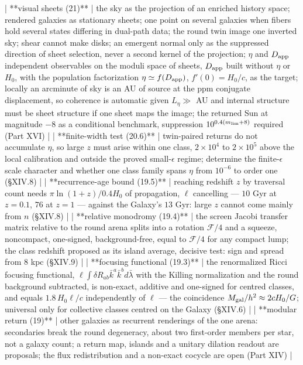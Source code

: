 | **visual sheets (21)** | the sky as the projection of an enriched history space; rendered galaxies as stationary sheets; one point on several galaxies when fibers hold several states differing in dual-path data; the round twin image one inverted sky; shear cannot make disks; an emergent normal only as the suppressed direction of sheet selection, never a second kernel of the projection; $\eta$ and $D_{\rm app}$ independent observables on the moduli space of sheets, $D_{\rm app}$ built without $\eta$ or $H_0$, with the population factorization $\eta\simeq f(D_{\rm app})$, $f'(0) = H_0/c$, as the target; locally an arcminute of sky is an AU of source at the ppm conjugate displacement, so coherence is automatic given $L_\eta\gg$ AU and internal structure must be sheet structure if one sheet maps the image; the returned Sun at magnitude $-8$ as a conditional benchmark, suppression $10^{0.4(m_{\rm lim}+8)}$ required (Part XVI) |
| **finite-width test (20.6)** | twin-paired returns do not accumulate $\eta$, so large $z$ must arise within one class, $2\times10^4$ to $2\times10^5$ above the local calibration and outside the proved small-$\epsilon$ regime; determine the finite-$\epsilon$ scale character and whether one class family spans $\eta$ from $10^{-6}$ to order one (§XIV.8) |
| **recurrence-age bound (19.5)** | reaching redshift $z$ by traversal count needs $\pi\ln(1+z)/0.4H_0$ of propagation, $\ell$ cancelling — $10$ Gyr at $z = 0.1$, $76$ at $z = 1$ — against the Galaxy's $13$ Gyr: large $z$ cannot come mainly from $n$ (§XIV.8) |
| **relative monodromy (19.4)** | the screen Jacobi transfer matrix relative to the round arena splits into a rotation $\mathcal F/4$ and a squeeze, noncompact, one-signed, background-free, equal to $\mathcal F/4$ for any compact lump; the class redshift proposed as its island average, decisive test: sign and spread from 8 kpc (§XIV.9) |
| **focusing functional (19.3)** | the renormalized Ricci focusing functional, $\ell\int\delta R_{ab}\bar k^a\bar k^b d\bar\lambda$ with the Killing normalization and the round background subtracted, is non-exact, additive and one-signed for centred classes, and equals $1.8\,H_0\ell/c$ independently of $\ell$ — the coincidence $M_{\rm gal}/h^2\approx2cH_0/G$; universal only for collective classes centred on the Galaxy (§XIV.6) |
| **modular return (19)** | other galaxies as recurrent renderings of the one arena: secondaries break the round degeneracy, about two first-order members per star, not a galaxy count; a return map, islands and a unitary dilation readout are proposals; the flux redistribution and a non-exact cocycle are open (Part XIV) |
